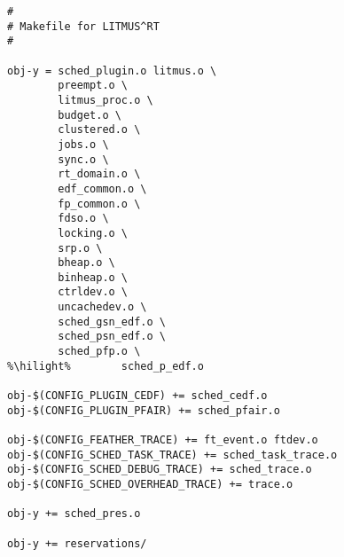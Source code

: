 \begin{lstlisting}[style=makefilestyle, escapechar=\%, caption=linux/litmus/Makefile]
#
# Makefile for LITMUS^RT
#

obj-y = sched_plugin.o litmus.o \
        preempt.o \
        litmus_proc.o \
        budget.o \
        clustered.o \
        jobs.o \
        sync.o \
        rt_domain.o \
        edf_common.o \
        fp_common.o \
        fdso.o \
        locking.o \
        srp.o \
        bheap.o \
        binheap.o \
        ctrldev.o \
        uncachedev.o \
        sched_gsn_edf.o \
        sched_psn_edf.o \
        sched_pfp.o \
%\hilight%        sched_p_edf.o

obj-$(CONFIG_PLUGIN_CEDF) += sched_cedf.o
obj-$(CONFIG_PLUGIN_PFAIR) += sched_pfair.o

obj-$(CONFIG_FEATHER_TRACE) += ft_event.o ftdev.o
obj-$(CONFIG_SCHED_TASK_TRACE) += sched_task_trace.o
obj-$(CONFIG_SCHED_DEBUG_TRACE) += sched_trace.o
obj-$(CONFIG_SCHED_OVERHEAD_TRACE) += trace.o

obj-y += sched_pres.o

obj-y += reservations/
\end{lstlisting}

